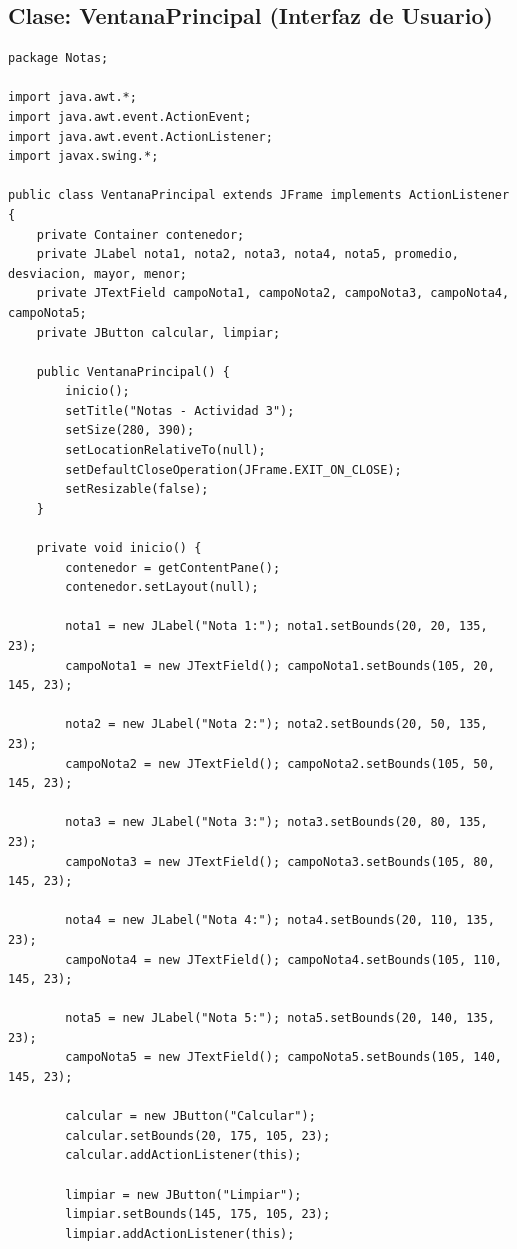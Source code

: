 \documentclass[12pt,a4paper]{article}
\begin{document}
\subsection*{Clase: VentanaPrincipal (Interfaz de Usuario)}
\begin{lstlisting}[caption={Clase VentanaPrincipal.java}]
package Notas;

import java.awt.*;
import java.awt.event.ActionEvent;
import java.awt.event.ActionListener;
import javax.swing.*;

public class VentanaPrincipal extends JFrame implements ActionListener {
    private Container contenedor;
    private JLabel nota1, nota2, nota3, nota4, nota5, promedio, desviacion, mayor, menor;
    private JTextField campoNota1, campoNota2, campoNota3, campoNota4, campoNota5;
    private JButton calcular, limpiar;

    public VentanaPrincipal() {
        inicio();
        setTitle("Notas - Actividad 3");
        setSize(280, 390);
        setLocationRelativeTo(null);
        setDefaultCloseOperation(JFrame.EXIT_ON_CLOSE);
        setResizable(false);
    }

    private void inicio() {
        contenedor = getContentPane();
        contenedor.setLayout(null);

        nota1 = new JLabel("Nota 1:"); nota1.setBounds(20, 20, 135, 23);
        campoNota1 = new JTextField(); campoNota1.setBounds(105, 20, 145, 23);

        nota2 = new JLabel("Nota 2:"); nota2.setBounds(20, 50, 135, 23);
        campoNota2 = new JTextField(); campoNota2.setBounds(105, 50, 145, 23);

        nota3 = new JLabel("Nota 3:"); nota3.setBounds(20, 80, 135, 23);
        campoNota3 = new JTextField(); campoNota3.setBounds(105, 80, 145, 23);

        nota4 = new JLabel("Nota 4:"); nota4.setBounds(20, 110, 135, 23);
        campoNota4 = new JTextField(); campoNota4.setBounds(105, 110, 145, 23);

        nota5 = new JLabel("Nota 5:"); nota5.setBounds(20, 140, 135, 23);
        campoNota5 = new JTextField(); campoNota5.setBounds(105, 140, 145, 23);

        calcular = new JButton("Calcular");
        calcular.setBounds(20, 175, 105, 23);
        calcular.addActionListener(this);

        limpiar = new JButton("Limpiar");
        limpiar.setBounds(145, 175, 105, 23);
        limpiar.addActionListener(this);


\end{lstlisting}
\end{document}
